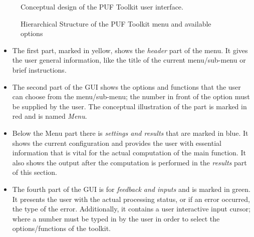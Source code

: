 \begin{figure}
\centering
{}
\caption{Conceptual design of the PUF Toolkit user interface.}
\label{img:gui_design}
\end{figure}

\begin{figure}
\centering
{}

\caption{Hierarchical Structure of the PUF Toolkit menu and available options}
\label{img:puf_menu}
\end{figure}

\begin{itemize}
	\item The first part, marked in yellow, shows the \emph{header} part of the menu. It gives the user general information, like the title of the current menu/sub-menu or brief instructions.
	\item The second part of the GUI shows the options and functions that the user can choose from the menu/sub-menu; the number in front of the option must be supplied by the user. The conceptual illustration of the part is marked in red and is named \emph{Menu}.
	\item Below the Menu part there is \emph{settings and results} that are marked in blue. It shows the current configuration and provides the user with essential information that is vital for the actual computation of the main function. It also shows the output after the computation is performed in the \emph{results} part of this section.
	\item The fourth part of the GUI is for \emph{feedback and inputs} and is marked in green. It presents the user with the actual processing status, or if an error occurred, the type of the error. Additionally, it contains a user interactive input cursor; where a number must be typed in by the user in order to select the options/functions of the toolkit.
\end{itemize}


